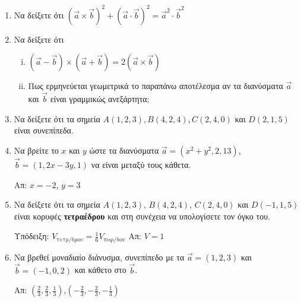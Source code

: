 \begin{enumerate}[itemsep=0.7\baselineskip]
  \item Να δείξετε ότι $ (\vec{a}\times \vec{b})^{2} + (\vec{a}\cdot \vec{b})^{2} =
    \vec{a}^{2}\cdot \vec{b}^{2} $  

  \item Να δείξετε ότι
    \begin{enumerate}[i)]
      \item $ ( \vec{a} - \vec{b} ) \times ( \vec{a} + \vec{b} ) = 2 (\vec{a} \times 
        \vec{b}) $
      \item Πως ερμηνεύεται γεωμετρικά το παραπάνω αποτέλεσμα αν τα διανύσματα 
        $ \vec{a} $ και $ \vec{b} $ είναι γραμμικώς ανεξάρτητα;
    \end{enumerate}


  \item Να δείξετε ότι τα σημεία $ A(1,2,3), B(4,2,4), C(2,4,0) $ και $ D(2,1,5) $ 
    είναι συνεπίπεδα.

  \item Να βρείτε το $x$ και $y$ ώστε τα διανύσματα $ \vec{a} = (x^{2}+y^{2},2,13) $, 
    $ \vec{b} = (1,2x-3y,1) $ να είναι μεταξύ τους κάθετα. 

    \hfill Απ: $ x=-2 $, $ y=3 $

  \item Να δείξετε ότι τα σημεία $ A(1,2,3) $, $ B(4,2,4) $, $ C(2,4,0) $ και 
    $ D(-1,1,5) $ είναι κορυφές \textbf{τετραέδρου} και στη συνέχεια να υπολογίσετε τον 
    όγκο του. 

    \textcolor{Col1}{Υπόδειξη:} 
    $ V_{\text{τετρ/δρου}} = \frac{1}{6} V_{\text{παρ/δου}} $   
    \hfill Απ: $ V=1 $

  \item Να βρεθεί μοναδιαίο διάνυσμα, συνεπίπεδο με τα $ \vec{a} = (1,2,3) $ και 
    $ \vec{b} = (-1,0,2) $ και κάθετο στο $ \vec{b} $.

    \hfill Απ: $ (\frac{2}{3}, \frac{2}{3}, \frac{1}{3}) $,$ (-\frac{2}{3},- 
    \frac{2}{3}, -\frac{1}{3})$  
\end{enumerate}



